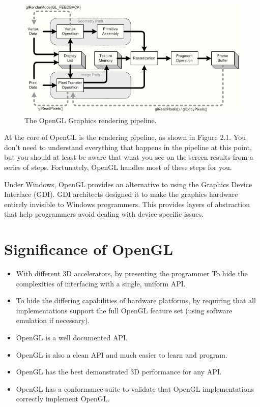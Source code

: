 \documentclass[12pt]{report}
\begin{document}
\begin{figure}[h!]
	\centering
		\includegraphics[scale=0.75]{opengl_pipeline.png}
	\caption{The OpenGL Graphics rendering pipeline.}
	\label{fig:logo2}
\end{figure}



At the core of OpenGL is the rendering pipeline, as shown in Figure 2.1. You don't need to
understand everything that happens in the pipeline at this point, but you should at least be aware
that what you see on the screen results from a series of steps. Fortunately, OpenGL handles most of these steps for you.


Under Windows, OpenGL provides an alternative to using the Graphics Device Interface (GDI). GDI architects designed it to make the graphics hardware entirely invisible to Windows programmers. This provides layers of abstraction that help programmers avoid dealing with device-specific issues.


\section{Significance of OpenGL}
\begin{itemize}
\item{With different 3D accelerators, by presenting the programmer To hide the complexities of interfacing with a single, uniform API.}
\item{To hide the differing capabilities of hardware platforms, by requiring that all implementations support the full OpenGL feature set (using software emulation if necessary).}
\item{OpenGL is a well documented API.}
\item{OpenGL is also a clean API and much easier to learn and program.}
\item{OpenGL has the best demonstrated 3D performance for any API.}
\item{OpenGL has a conformance suite to validate that OpenGL implementations correctly implement OpenGL.}
\end{itemize}
\end{document}
